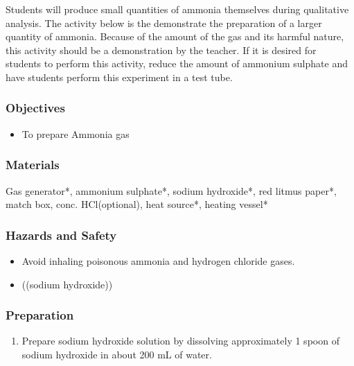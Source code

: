 Students will produce small quantities of ammonia themselves during qualitative analysis. The activity below is the demonstrate the preparation of a larger quantity of ammonia. Because of the amount of the gas and its harmful nature, this activity should be a demonstration by the teacher. If it is desired for students to perform this activity, reduce the amount of ammonium sulphate and have students perform this experiment in a test tube.

\subsubsection*{Objectives}
\begin{itemize}
\item{To prepare Ammonia gas}
\end{itemize}

\subsubsection*{Materials}
Gas generator*, ammonium sulphate*, sodium hydroxide*, red litmus paper*, match box, conc. HCl(optional), heat source*, heating vessel*

\subsubsection*{Hazards and Safety}
\begin{itemize}
\item{Avoid inhaling poisonous ammonia and hydrogen chloride gases.}
\item{((sodium hydroxide))}
\end{itemize}

\subsubsection*{Preparation}
\begin{enumerate}
\item{Prepare sodium hydroxide solution by dissolving approximately 1 spoon of sodium hydroxide in about 200 mL of water.}
\end{enumerate}

